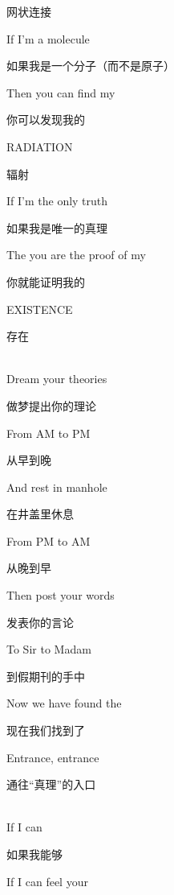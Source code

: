 \documentclass[UTF8,12pt,oneside]{ctexbook}
\begin{document}
\begin{center}
            网状连接
            
            If I’m a molecule
            
            如果我是一个分子（而不是原子）
            
            Then you can find my
            
            你可以发现我的
            
            RADIATION
            
            辐射
            
            If I’m the only truth
            
            如果我是唯一的真理
            
            The you are the proof of my
            
            你就能证明我的
            
            EXISTENCE
            
            存在
            
            ~\\
            Dream your theories
            
            做梦提出你的理论
            
            From AM to PM
            
            从早到晚
            
            And rest in manhole
            
            在井盖里休息
            
            From PM to AM
            
            从晚到早
            
            Then post your words
            
            发表你的言论
            
            To Sir to Madam
            
            到假期刊的手中
            
            Now we have found the
            
            现在我们找到了
            
            Entrance, entrance
            
            通往“真理”的入口

            ~\\
            If I can
            
            如果我能够
            
            If I can feel your
            

\end{center}
\end{document}
